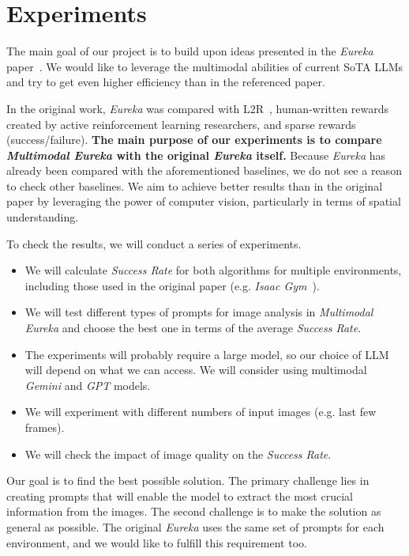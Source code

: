 \documentclass[10pt,twocolumn]{article}
\begin{document}
\section{Experiments}
The main goal of our project is to build upon ideas presented in the \textit{Eureka} paper~\cite{eureka}. We would like to leverage the multimodal abilities of current SoTA LLMs and try to get even higher efficiency than in the referenced paper.

In the original work, \textit{Eureka} was compared with L2R~\cite{l2r}, human-written rewards created by active reinforcement learning researchers, and sparse rewards (success/failure). \textbf{The main purpose of our experiments is to compare \textit{Multimodal Eureka} with the original \textit{Eureka} itself.} Because \textit{Eureka} has already been compared with the aforementioned baselines, we do not see a reason to check other baselines. We aim to achieve better results than in the original paper by leveraging the power of computer vision, particularly in terms of spatial understanding.

To check the results, we will conduct a series of experiments.

\begin{itemize}
    \item We will calculate \textit{Success Rate} for both algorithms for multiple environments, including those used in the original paper (e.g. \textit{Isaac Gym}~\cite{isaac_gym}).
    \item We will test different types of prompts for image analysis in \textit{Multimodal Eureka} and choose the best one in terms of the average \textit{Success Rate}.
    \item The experiments will probably require a large model, so our choice of LLM will depend on what we can access. We will consider using multimodal \textit{Gemini} and \textit{GPT} models.
    \item We will experiment with different numbers of input images (e.g. last few frames).
    \item We will check the impact of image quality on the \textit{Success Rate}.
\end{itemize}

Our goal is to find the best possible solution. The primary challenge lies in creating prompts that will enable the model to extract the most crucial information from the images. The second challenge is to make the solution as general as possible. The original \textit{Eureka} uses the same set of prompts for each environment, and we would like to fulfill this requirement too.
\end{document}
